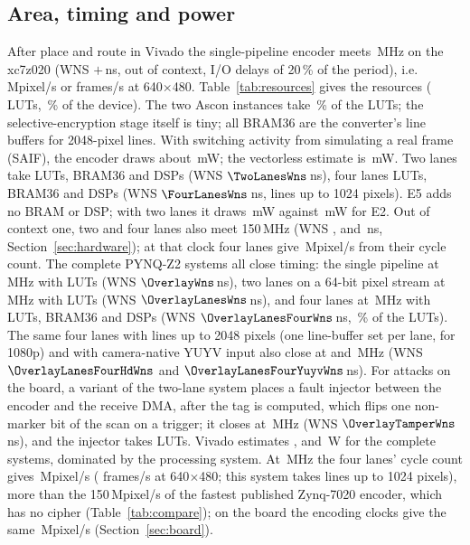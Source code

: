 \subsection{Area, timing and power}

After place and route in Vivado the single-pipeline encoder meets \TopMhz\,MHz on the xc7z020 (WNS $+$\TopWns\,ns, out of context, I/O delays of 20\,\% of the period), i.e.\ \TopMpix\,Mpixel/s or \FpsVGA{} frames/s at 640$\times$480. Table~\ref{tab:resources} gives the resources (\TopLuts{} LUTs, \TopLutPct\,\% of the device). The two Ascon instances take \CryptoLutShare\,\% of the LUTs; the selective-encryption stage itself is tiny; all \ConvBram{} BRAM36 are the converter's line buffers for 2048-pixel lines. With switching activity from simulating a real frame (SAIF), the encoder draws about \SaifTopMw\,mW; the vectorless estimate is \TopPowerMw\,mW. Two lanes take \TwoLanesLuts{} LUTs, \TwoLanesBram{} BRAM36 and \TwoLanesDsp{} DSPs (WNS $\TwoLanesWns$\,ns), four lanes \FourLanesLuts{} LUTs, \FourLanesBram{} BRAM36 and \FourLanesDsp{} DSPs (WNS $\FourLanesWns$\,ns, lines up to 1024 pixels). E5 adds no BRAM or DSP; with two lanes it draws \SaifLanesEfiveMw\,mW against \SaifLanesEtwoMw\,mW for E2. Out of context one, two and four lanes also meet 150\,MHz (WNS \TopWnsAtOneFifty, \LanesTwoWnsAtOneFifty{} and \LanesFourWnsAtOneFifty\,ns, Section~\ref{sec:hardware}); at that clock four lanes give \LanesFourFastMpix\,Mpixel/s from their cycle count. The complete PYNQ-Z2 systems all close timing: the single pipeline at \OverlayMhz\,MHz with \OverlayLuts{} LUTs (WNS $\OverlayWns$\,ns), two lanes on a 64-bit pixel stream at \OverlayLanesMhz\,MHz with \OverlayLanesLuts{} LUTs (WNS $\OverlayLanesWns$\,ns), and four lanes at \OverlayLanesFourMhz\,MHz with \OverlayLanesFourLuts{} LUTs, \OverlayLanesFourBram{} BRAM36 and \OverlayLanesFourDsp{} DSPs (WNS $\OverlayLanesFourWns$\,ns, \OverlayLanesFourLutPct\,\% of the LUTs). The same four lanes with lines up to 2048 pixels (one line-buffer set per lane, for 1080p) and with camera-native YUYV input also close at \OverlayLanesFourHdMhz{} and \OverlayLanesFourYuyvMhz\,MHz (WNS $\OverlayLanesFourHdWns$ and $\OverlayLanesFourYuyvWns$\,ns). For attacks on the board, a variant of the two-lane system places a fault injector between the encoder and the receive DMA, after the tag is computed, which flips one non-marker bit of the scan on a trigger; it closes at \OverlayTamperMhz\,MHz (WNS $\OverlayTamperWns$\,ns), and the injector takes \TamperInjLuts{} LUTs. Vivado estimates \OverlayPowerW, \OverlayLanesPowerW{} and \OverlayLanesFourPowerW\,W for the complete systems, dominated by the processing system. At \OverlayLanesFourMhz\,MHz the four lanes' cycle count gives \SysFourLanesMpix\,Mpixel/s (\SysFourLanesFps{} frames/s at 640$\times$480; this system takes lines up to 1024 pixels), more than the 150\,Mpixel/s of the fastest published Zynq-7020 encoder, which has no cipher (Table~\ref{tab:compare}); on the board the encoding clocks give the same \BdFourBusyMpix\,Mpixel/s (Section~\ref{sec:board}).

